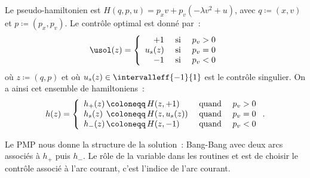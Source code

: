 Le pseudo-hamiltonien est
$    H(q,p,u) = p_x v + p_v (-\lambda v^2 + u)$,
avec $q \coloneqq (x,v)$ et $ p \coloneqq (p_x,p_v)$.
Le contr\^ole optimal est donn\'e par~:
\begin{equation*}
\usol(z) = \left\{
    \begin{array}{rll}
       +1       & \text{ si } & p_v > 0\\
       u_s(z)   & \text{ si } & p_v = 0\\
       -1       & \text{ si } & p_v < 0
   \end{array}
   \right.
\end{equation*}
o\`u $z \coloneqq (q,p)$ et o\`u $u_s(z) \in \intervalleff{-1}{1}$ est le contr\^ole singulier.
On a ainsi cet ensemble de hamiltoniens~:
\begin{equation*}
    h(z) = \left\{
    \begin{array}{l@{\,\coloneqq\,}lll}
        h_+(z) & H(z,+1)     & \text{ quand } & p_v > 0\\
        h_s(z) & H(z,u_s(z)) & \text{ quand } & p_v = 0\\
        h_-(z) & H(z,-1)     & \text{ quand } & p_v < 0
    \end{array} \right.
    .
\end{equation*}

Le PMP nous donne la structure de la solution~: Bang-Bang avec deux arcs associ\'es \`a $h_+$ puis $h_-$.
Le r\^ole de la variable  dans les routines  et  est de choisir le contr\^ole associ\'e \`a l'arc courant,
\ie c'est l'indice de l'arc courant.





